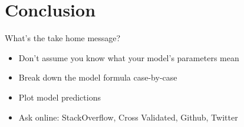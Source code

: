 \documentclass{beamer}
\begin{document}
\section{Conclusion}

\begin{frame}{What's the take home message?}

  \begin{itemize}
    \pause\item Don't assume you know what your model's parameters mean
    \pause\item Break down the model formula case-by-case
    \pause\item Plot model predictions
    \pause\item Ask online\pause: StackOverflow\pause, Cross Validated\pause, Github\pause, Twitter
  \end{itemize}
  \vspace{3em}
  \pause

\end{frame}
\end{document}
